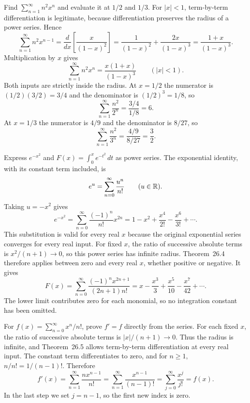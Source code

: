 \goal Find $\sum_{n=1}^\infty n^2x^n$ and evaluate it at $1/2$ and $1/3$.
For $|x|<1$, term-by-term differentiation is legitimate, because differentiation
preserves the radius of a power series. Hence
\[
 \sum_{n=1}^\infty n^2x^{n-1}
 =\frac{d}{dx}\left[\frac{x}{(1-x)^2}\right]
 =\frac1{(1-x)^2}+\frac{2x}{(1-x)^3}
 =\frac{1+x}{(1-x)^3}.
\]
Multiplication by $x$ gives
\[
 \boxed{\sum_{n=1}^\infty n^2x^n=\frac{x(1+x)}{(1-x)^3}}
 \qquad(|x|<1).
\]
Both inputs are strictly inside the radius. At $x=1/2$ the numerator is
$(1/2)(3/2)=3/4$ and the denominator is $(1/2)^3=1/8$, so
\[
 \sum_{n=1}^\infty\frac{n^2}{2^n}=\frac{3/4}{1/8}=6.
\]
At $x=1/3$ the numerator is $4/9$ and the denominator is $8/27$, so
\[
 \sum_{n=1}^\infty\frac{n^2}{3^n}=\frac{4/9}{8/27}=\frac32.
\]

\goal Express $e^{-x^2}$ and $F(x)=\int_0^x e^{-t^2}\,dt$ as power series.
The exponential identity, with its constant term included, is
\[
 e^u=\sum_{n=0}^\infty\frac{u^n}{n!}\qquad(u\in\mathbb{R}).
\]
Taking $u=-x^2$ gives
\[
 e^{-x^2}=\sum_{n=0}^\infty\frac{(-1)^n}{n!}x^{2n}
 =1-x^2+\frac{x^4}{2!}-\frac{x^6}{3!}+\cdots.
\]
This substitution is valid for every real $x$ because the original exponential
series converges for every real input.
For fixed $x$, the ratio of successive absolute terms is $x^2/(n+1)\to0$,
so this power series has infinite radius. Theorem~26.4 therefore applies
between zero and every real $x$, whether positive or negative. It gives
\[
 \boxed{F(x)=\sum_{n=0}^\infty
       \frac{(-1)^n x^{2n+1}}{(2n+1)n!}}
 =x-\frac{x^3}{3}+\frac{x^5}{10}-\frac{x^7}{42}+\cdots.
\]
The lower limit contributes zero for each monomial, so no integration constant
has been omitted.

\goal For $f(x)=\sum_{n=0}^\infty x^n/n!$, prove $f'=f$ directly from the series.
For each fixed $x$, the ratio of successive absolute terms is
$|x|/(n+1)\to0$. Thus the radius is infinite, and Theorem~26.5 allows
term-by-term differentiation at every real input.
The constant term differentiates to zero, and for $n\ge1$,
$n/n!=1/(n-1)!$. Therefore
\[
 f'(x)=\sum_{n=1}^\infty\frac{nx^{n-1}}{n!}
 =\sum_{n=1}^\infty\frac{x^{n-1}}{(n-1)!}
 =\sum_{j=0}^\infty\frac{x^j}{j!}=f(x).
\]
In the last step we set $j=n-1$, so the first new index is zero.

